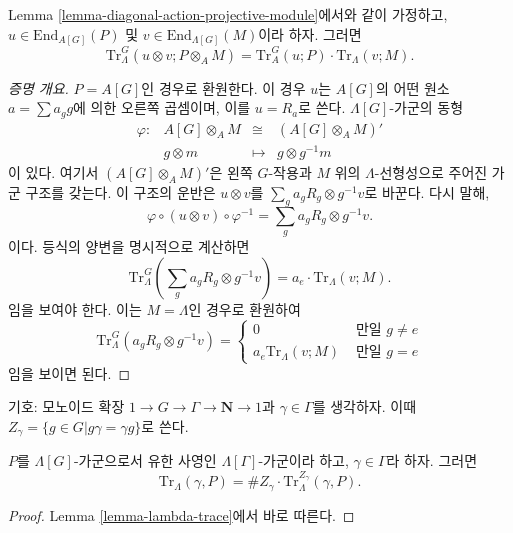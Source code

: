 \begin{lemma}
\label{lemma-multiplicative-trace}
Lemma \ref{lemma-diagonal-action-projective-module}에서와 같이 가정하고,
$u\in \text{End}_{A[G]}(P)$ 및
$v\in \text{End}_{\Lambda[G]}(M)$이라 하자. 그러면
$$
\text{Tr}_\Lambda^G \left(u \otimes v; P \otimes_A M\right) = \text{Tr}_A^G(u;
P)\cdot \text{Tr}_\Lambda(v;M).
$$
\end{lemma}

\begin{proof}[증명 개요]
$P=A[G]$인 경우로 환원한다. 이 경우 $u$는 $A[G]$의 어떤 원소
$a = \sum a_gg$에 의한 오른쪽 곱셈이며, 이를 $u = R_a$로 쓴다.
$\Lambda[G]$-가군의 동형
$$
\begin{matrix}
\varphi : & A[G]\otimes_A M & \cong & \left(A[G]\otimes_A M\right)'\\
& g \otimes m & \longmapsto & g \otimes g^{-1}m
\end{matrix}
$$
이 있다. 여기서 $\left(A[G]\otimes_A M\right)'$은 왼쪽
$G$-작용과 $M$ 위의 $\Lambda$-선형성으로 주어진 가군 구조를 갖는다.
이 구조의 운반은 $u \otimes v$를
$\sum_ga_gR_g \otimes g^{-1}v$로 바꾼다. 다시 말해,
$$
\varphi \circ (u \otimes v) \circ \varphi^{-1}
=
\sum_ga_gR_g \otimes g^{-1}v.
$$
이다. 등식의 양변을 명시적으로 계산하면
$$
\text{Tr}_\Lambda^G\left(\sum_g a_gR_g \otimes g^{-1}v\right) = a_e\cdot
\text{Tr}_\Lambda(v; M).
$$
임을 보여야 한다. 이는 $M=\Lambda$인 경우로 환원하여
$$
\text{Tr}_\Lambda^G\left(a_gR_g \otimes g^{-1}v\right) =
\left\{
\begin{matrix}
0 & \text{ 만일 } g\neq e\\
a_e\text{Tr}_\Lambda\left(v; M\right) & \text{ 만일 }g = e
\end{matrix}
\right.
$$
임을 보이면 된다.
\end{proof}

\noindent
기호:
모노이드 확장 $1 \to G\to \Gamma\to \mathbf{N} \to 1$과
$\gamma\in \Gamma$를 생각하자.
이때 $Z_\gamma = \{g\in G | g\gamma = \gamma g\}$로 쓴다.

\begin{lemma}
\label{lemma-gamma-z-gamma-trace}
$P$를 $\Lambda[G]$-가군으로서 유한 사영인
$\Lambda[\Gamma]$-가군이라 하고, $\gamma \in \Gamma$라 하자. 그러면
$$
\text{Tr}_{\Lambda}(\gamma, P) =
\# Z_\gamma \cdot \text{Tr}_\Lambda^{Z_\gamma}\left(\gamma, P\right).
$$
\end{lemma}

\begin{proof}
Lemma \ref{lemma-lambda-trace}에서 바로 따른다.
\end{proof}

